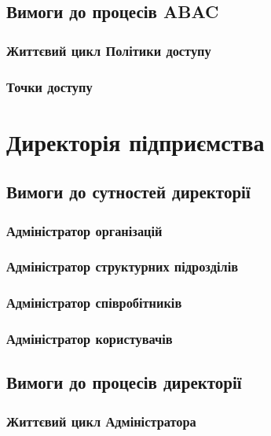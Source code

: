 \subsection{Вимоги до процесів ABAC}

\subsubsection{Життєвий цикл Політики доступу}

\subsubsection{Точки доступу}

\newpage
\section{Директорія підприємства}

\subsection{Вимоги до сутностей директорії}

\subsubsection{Адміністратор організацій}

\subsubsection{Адміністратор структурних підрозділів}

\subsubsection{Адміністратор співробітників}

\subsubsection{Адміністратор користувачів}

\subsection{Вимоги до процесів директорії}

\subsubsection{Життєвий цикл Адміністратора}

